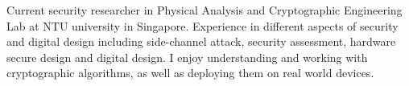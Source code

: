 

\begin{cvparagraph}

Current security researcher in Physical Analysis and Cryptographic Engineering Lab at NTU university in Singapore. Experience in different aspects of security and digital design including side-channel attack, security assessment, hardware secure design and digital design. I enjoy understanding and working with cryptographic algorithms, as well as deploying them on real world devices. 
\end{cvparagraph}
